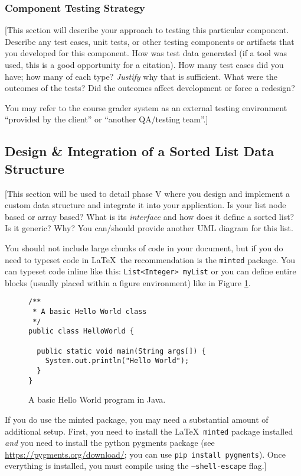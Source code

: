 \documentclass[12pt]{scrartcl} %
\begin{document}
\subsubsection{Component Testing Strategy}

[This section will describe your approach to testing this particular 
component.  Describe any test cases, unit tests, or other testing 
components or artifacts that you developed for this component.  How
was test data generated (if a tool was used, this is a good opportunity
for a citation).  How many test cases did you have; how many of each type?  
\emph{Justify} why that is sufficient.  What were the outcomes of the tests?
Did the outcomes affect development or force a redesign?

You may refer to the course grader system as an external testing 
environment ``provided by the client'' or ``another QA/testing team''.]

\subsection{Design \& Integration of a Sorted List Data Structure}

[This section will be used to detail phase V where you design and 
implement a custom data structure and integrate it into your application.  
Is your list node based or array based?  What is its \emph{interface}
and how does it define a sorted list?  Is it generic?  Why?  
You can/should provide another UML diagram for this list.

You should not include large chunks of code in your document, but if you do
need to typeset code in \LaTeX\ the recommendation is the 
\texttt{minted} package.  You can typeset code inline like this: 
\texttt{List<Integer> myList} or you can define
entire blocks (usually placed within a figure environment) like in
Figure \ref{figure:helloWorldJava}.

\begin{figure}[h]%
\begin{verbatim}
/**
 * A basic Hello World class
 */
public class HelloWorld {

  public static void main(String args[]) {
    System.out.println("Hello World");
  }
}
\end{verbatim}
\caption{A basic Hello World program in Java.}
\label{figure:helloWorldJava}
\end{figure}

If you do use the minted package, you may need a substantial amount of 
additional setup.  First, you need to install the \LaTeX\ \texttt{minted}
package installed \emph{and} you need to install the python pygments package
(see \url{https://pygments.org/download/}; you can use \texttt{pip install pygments}).
Once everything is installed, you must compile using the 
\texttt{--shell-escape} flag.]
\end{document}
